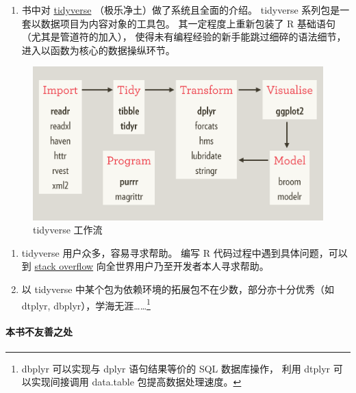 \documentclass[11pt,hyperref]{ctexart}
\providecommand{\tightlist}{%
  \setlength{\itemsep}{0pt}\setlength{\parskip}{0pt}}
\let\oldparagraph\paragraph
\renewcommand{\paragraph}[1]{\oldparagraph{#1}\mbox{}}
\begin{document}
\begin{enumerate}
\def\labelenumi{\arabic{enumi}.}
\setcounter{enumi}{1}
\tightlist
\item
  书中对 \href{https://www.tidyverse.org/}{tidyverse}
  （极乐净土）做了系统且全面的介绍。 tidyverse
  系列包是一套以数据项目为内容对象的工具包。 其一定程度上重新包装了 R
  基础语句（尤其是管道符的加入），
  使得未有编程经验的新手能跳过细碎的语法细节，进入以函数为核心的数据操纵环节。
\end{enumerate}

\begin{figure}
\centering
\includegraphics{images/tidyverse-workflow.png}
\caption{tidyverse 工作流}
\end{figure}

\begin{enumerate}
\def\labelenumi{\arabic{enumi}.}
\setcounter{enumi}{2}
\item
  tidyverse 用户众多，容易寻求帮助。 编写 R
  代码过程中遇到具体问题，可以到
  \href{https://stackoverflow.com/questions/tagged/r}{stack overflow}
  向全世界用户乃至开发者本人寻求帮助。
\item
  以 tidyverse 中某个包为依赖环境的拓展包不在少数，部分亦十分优秀（如
  dtplyr, dbplyr），学海无涯\ldots\ldots{}\footnote{dbplyr 可以实现与
    dplyr 语句结果等价的 SQL 数据库操作， 利用 dtplyr 可以实现间接调用
    data.table 包提高数据处理速度。}
\end{enumerate}

\hypertarget{ux672cux4e66ux4e0dux53cbux5584ux4e4bux5904}{%
\paragraph{本书不友善之处}\label{ux672cux4e66ux4e0dux53cbux5584ux4e4bux5904}}
\end{document}
